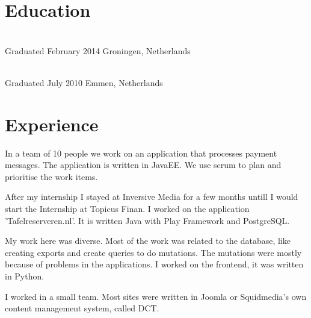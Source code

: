 \documentclass[]{deedy-resume-openfont}
\begin{document}
\begin{minipage}[t]{0.66\textwidth} 
	

\section{Education} 

\\
Graduated February 2014
Groningen, Netherlands
\sectionsep

\\
Graduated July 2010 Emmen, Netherlands
\sectionsep


\section{Experience}

In a team of 10 people we work on an application that processes payment messages. 
The application is written in JavaEE. 
We use scrum to plan and prioritise the work items.
\sectionsep

After my internship I stayed at Inversive Media for a few months untill I would start the Internship at Topicus Finan.
I worked on the application 'Tafelreserveren.nl'. It is written Java with Play Framework and PostgreSQL.
\sectionsep

My work here was diverse. 
Most of the work was related to the database, like creating exports and create queries to do mutations.
The mutations were mostly because of problems in the applications.
I worked on the frontend, it was written in Python.
\sectionsep

I worked in a small team.
Most sites were written in Joomla or Squidmedia's own content management system, called DCT.
\sectionsep


\end{minipage}
\end{document}

